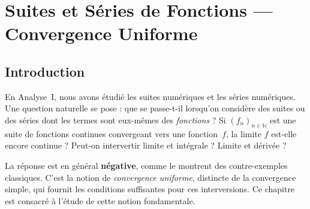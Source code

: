 \documentclass[12pt,a4paper,openany]{book}
\theoremstyle{definition}
\newcommand{\N}{\mathbb{N}}
\begin{document}
\bigskip
\begin{center}
\end{center}

\chapter{Suites et Séries de Fonctions --- Convergence Uniforme}
\label{chap:suites-series-fonctions}

\section*{Introduction}

En Analyse~I, nous avons étudié les suites numériques et les séries numériques. Une question naturelle se pose : que se passe-t-il lorsqu'on considère des suites ou des séries dont les termes sont eux-mêmes des \emph{fonctions} ? Si $(f_n)_{n \in \N}$ est une suite de fonctions continues convergeant vers une fonction~$f$, la limite $f$ est-elle encore continue ? Peut-on intervertir limite et intégrale ? Limite et dérivée ?

La réponse est en général \textbf{négative}, comme le montrent des contre-exemples classiques. C'est la notion de \emph{convergence uniforme}, distincte de la convergence simple, qui fournit les conditions suffisantes pour ces interversions. Ce chapitre est consacré à l'étude de cette notion fondamentale.
\end{document}
